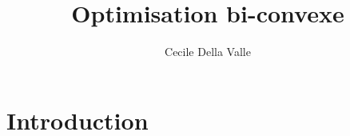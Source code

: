 \documentclass[a4paper]{article}
\title{Optimisation bi-convexe}
\author{Cecile Della Valle}
\begin{document}
\maketitle



\section*{Introduction}
\end{document}
